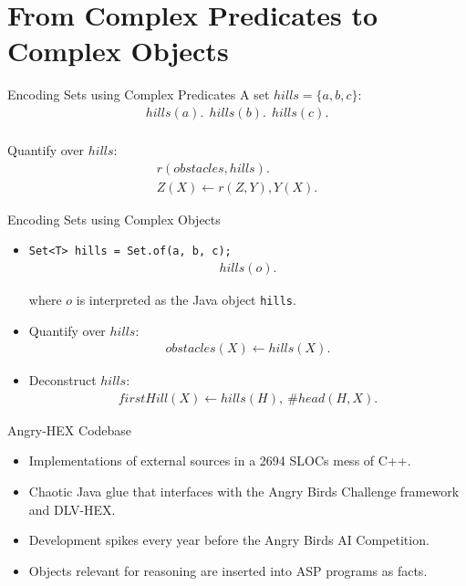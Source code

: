\documentclass[smaller,dvipsnames]{beamer}
\newcommand{\ab}{Angry Birds\xspace}
\begin{document}
\section{From Complex Predicates to Complex Objects}

\begin{frame}{Encoding Sets using Complex Predicates}
	A set \(hills = \{ a, b, c \}\):
    \begin{align*}
    	hills(a).~~hills(b).~~hills(c). \\
    \end{align*}

	Quantify over \(hills\):
	\begin{align*}
		r(obstacles,hills). \\
		Z(X) \leftarrow r(Z,Y), Y(X).
	\end{align*}
\end{frame}

\begin{frame}{Encoding Sets using Complex Objects}
	\begin{itemize}[<+->]
	\item{\texttt{Set<T> hills = Set.of(a, b, c);}
    \begin{align*}
    	hills(o).
    \end{align*}

	where \(o\) is interpreted as the Java object \texttt{hills}.}


	\item{Quantify over \(hills\):
	\begin{align*}
		obstacles(X) \leftarrow hills(X).
	\end{align*}}
	
	\item{Deconstruct \(hills\):
	\begin{align*}
		firstHill(X) \leftarrow hills(H),\ \#head(H,X).
	\end{align*}}
	\end{itemize}
\end{frame}

\begin{frame}{Angry-HEX Codebase}
	\begin{itemize}[<+->]
		\item Implementations of external sources in a 2694 SLOCs mess of C++.
		\item Chaotic Java glue that interfaces with the \ab Challenge {framework} and DLV-HEX.
		\item Development spikes every year before the Angry Birds AI Competition.
		\item Objects relevant for reasoning are inserted into ASP programs as facts.
	\end{itemize}
\end{frame}
\end{document}
